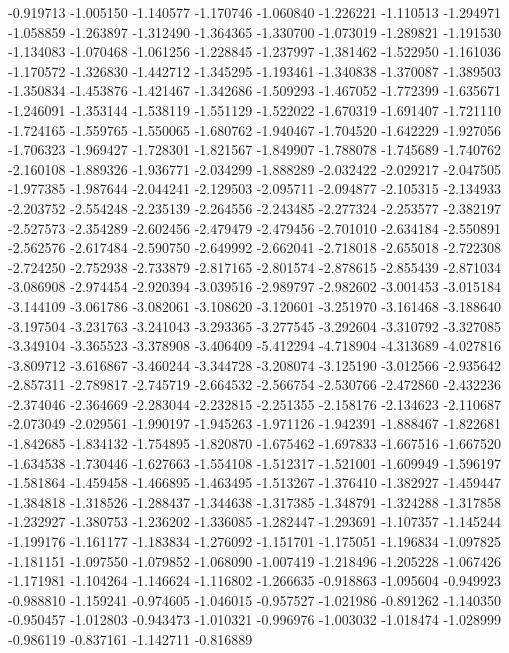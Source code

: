 -0.919713
-1.005150
-1.140577
-1.170746
-1.060840
-1.226221
-1.110513
-1.294971
-1.058859
-1.263897
-1.312490
-1.364365
-1.330700
-1.073019
-1.289821
-1.191530
-1.134083
-1.070468
-1.061256
-1.228845
-1.237997
-1.381462
-1.522950
-1.161036
-1.170572
-1.326830
-1.442712
-1.345295
-1.193461
-1.340838
-1.370087
-1.389503
-1.350834
-1.453876
-1.421467
-1.342686
-1.509293
-1.467052
-1.772399
-1.635671
-1.246091
-1.353144
-1.538119
-1.551129
-1.522022
-1.670319
-1.691407
-1.721110
-1.724165
-1.559765
-1.550065
-1.680762
-1.940467
-1.704520
-1.642229
-1.927056
-1.706323
-1.969427
-1.728301
-1.821567
-1.849907
-1.788078
-1.745689
-1.740762
-2.160108
-1.889326
-1.936771
-2.034299
-1.888289
-2.032422
-2.029217
-2.047505
-1.977385
-1.987644
-2.044241
-2.129503
-2.095711
-2.094877
-2.105315
-2.134933
-2.203752
-2.554248
-2.235139
-2.264556
-2.243485
-2.277324
-2.253577
-2.382197
-2.527573
-2.354289
-2.602456
-2.479479
-2.479456
-2.701010
-2.634184
-2.550891
-2.562576
-2.617484
-2.590750
-2.649992
-2.662041
-2.718018
-2.655018
-2.722308
-2.724250
-2.752938
-2.733879
-2.817165
-2.801574
-2.878615
-2.855439
-2.871034
-3.086908
-2.974454
-2.920394
-3.039516
-2.989797
-2.982602
-3.001453
-3.015184
-3.144109
-3.061786
-3.082061
-3.108620
-3.120601
-3.251970
-3.161468
-3.188640
-3.197504
-3.231763
-3.241043
-3.293365
-3.277545
-3.292604
-3.310792
-3.327085
-3.349104
-3.365523
-3.378908
-3.406409
-5.412294
-4.718904
-4.313689
-4.027816
-3.809712
-3.616867
-3.460244
-3.344728
-3.208074
-3.125190
-3.012566
-2.935642
-2.857311
-2.789817
-2.745719
-2.664532
-2.566754
-2.530766
-2.472860
-2.432236
-2.374046
-2.364669
-2.283044
-2.232815
-2.251355
-2.158176
-2.134623
-2.110687
-2.073049
-2.029561
-1.990197
-1.945263
-1.971126
-1.942391
-1.888467
-1.822681
-1.842685
-1.834132
-1.754895
-1.820870
-1.675462
-1.697833
-1.667516
-1.667520
-1.634538
-1.730446
-1.627663
-1.554108
-1.512317
-1.521001
-1.609949
-1.596197
-1.581864
-1.459458
-1.466895
-1.463495
-1.513267
-1.376410
-1.382927
-1.459447
-1.384818
-1.318526
-1.288437
-1.344638
-1.317385
-1.348791
-1.324288
-1.317858
-1.232927
-1.380753
-1.236202
-1.336085
-1.282447
-1.293691
-1.107357
-1.145244
-1.199176
-1.161177
-1.183834
-1.276092
-1.151701
-1.175051
-1.196834
-1.097825
-1.181151
-1.097550
-1.079852
-1.068090
-1.007419
-1.218496
-1.205228
-1.067426
-1.171981
-1.104264
-1.146624
-1.116802
-1.266635
-0.918863
-1.095604
-0.949923
-0.988810
-1.159241
-0.974605
-1.046015
-0.957527
-1.021986
-0.891262
-1.140350
-0.950457
-1.012803
-0.943473
-1.010321
-0.996976
-1.003032
-1.018474
-1.028999
-0.986119
-0.837161
-1.142711
-0.816889
